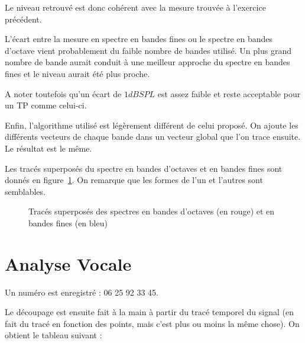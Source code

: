 \documentclass[11pt,a4paper]{article}
\begin{document}
Le niveau retrouvé est donc cohérent avec la mesure trouvée à l'exercice précédent.

L'écart entre la mesure en spectre en bandes fines ou le spectre en bandes d'octave vient probablement du faible nombre de bandes utilisé. Un plus grand nombre de bande aurait conduit à une meilleur approche du spectre en bandes fines et le niveau aurait été plus proche.

A noter toutefois qu'un écart de $1 dB SPL$ est assez faible et reste acceptable pour un TP comme celui-ci.

Enfin, l'algorithme utilisé est légèrement différent de celui proposé. On ajoute les différents vecteurs de chaque bande dans un vecteur global que l'on trace ensuite. Le résultat est le même.

Les tracés superposés du spectre en bandes d'octaves et en bandes fines sont donnés en figure~\ref{traces}. On remarque
que les formes de l'un et l'autres sont semblables.

\begin{figure}[h!]
    \caption{\label{traces}Tracés superposés des spectres en bandes d'octaves (en rouge) et en bandes fines (en bleu)}
\end{figure}

\section{Analyse Vocale}

Un numéro est enregistré : 06 25 92 33 45.

Le découpage est ensuite fait à la main à partir du tracé temporel du signal (en fait du tracé en fonction des points,
mais c'est plus ou moins la même chose). On obtient le tableau suivant :
\end{document}
